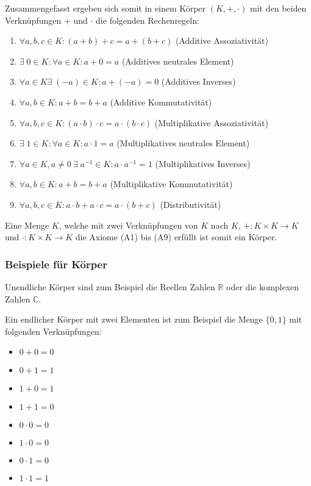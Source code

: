 \documentclass{article}
\begin{document}
Zusammengefasst ergeben sich somit in einem Körper $(K, +, \cdot)$ mit den beiden Verknüpfungen $+$
und $\cdot$ die folgenden Rechenregeln:

\begin{enumerate}[label=(A\arabic*)]
\item \label{a1} $\forall a,b,c \in K \colon (a + b) + c = a + (b + c)$
  (Additive Assoziativität)
\item \label{a2} $\exists \; 0 \in K \colon \forall a \in K \colon a + 0 = a$
  (Additives neutrales Element)
\item \label{a3} $\forall a \in K \exists \; (-a) \in K \colon a + (-a) = 0$
  (Additives Inverses)
\item \label{a4} $\forall a,b \in K \colon a + b = b + a$
  (Additive Kommutativität)
\item \label{a5} $\forall a,b,c \in K \colon (a \cdot b) \cdot c = a \cdot (b \cdot c)$
  (Multiplikative Assoziativität)
\item \label{a6} $\exists \; 1 \in K \colon \forall a \in K \colon a \cdot 1 = a$
  (Multiplikatives neutrales Element)
\item \label{a7} $\forall a \in K, a \ne 0 \: \exists \; a^{-1} \in K \colon a \cdot a^{-1} = 1$
  (Multiplikatives Inverses)
\item \label{a8} $\forall a,b \in K \colon a + b = b + a$
  (Multiplikative Kommutativität)
\item \label{a9} $\forall a,b,c \in K \colon a \cdot b + a \cdot c = a \cdot (b + c)$
  (Distributivität)
\end{enumerate}

Eine Menge $K$, welche mit zwei Verknüpfungen von $K$ nach $K$, $+\colon K \times K \to K$ und
$\cdot\colon K \times K \to K$ die Axiome (A1) bis (A9) erfüllt ist somit ein Körper.

\subsubsection*{Beispiele für Körper}

Unendliche Körper sind zum Beispiel die Reellen Zahlen $\mathbb{R}$ oder die komplexen Zahlen $\mathbb{C}$.

Ein endlicher Körper mit zwei Elementen ist zum Beispiel die Menge $\{ 0, 1\}$ mit folgenden Verknüpfungen:

\begin{itemize}
\item $0 + 0 = 0$
\item $0 + 1 = 1$
\item $1 + 0 = 1$
\item $1 + 1 = 0$
\item $0 \cdot 0 = 0$
\item $1 \cdot 0 = 0$
\item $0 \cdot 1 = 0$
\item $1 \cdot 1 = 1$
\end{itemize}
\end{document}
